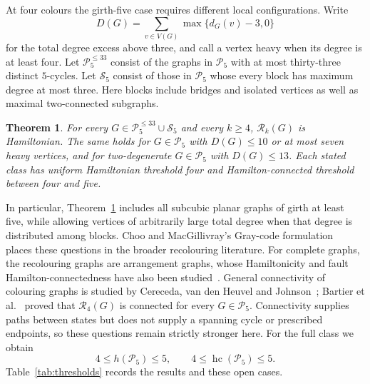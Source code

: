 \documentclass[11pt]{article}
\newtheorem{theorem}{Theorem}[section]
\theoremstyle{remark}
\newcommand{\R}{\mathcal R}
\newcommand{\Rk}{\mathcal R_k}
\newcommand{\hc}{\operatorname{hc}}
\numberwithin{equation}{section}
\numberwithin{table}{section}
\begin{document}
At four colours the girth-five case requires different local
configurations. Write
\[
 D(G)=\sum_{v\in V(G)}\max\{d_G(v)-3,0\}
\]
for the total degree excess above three, and call a vertex heavy when
its degree is at least four. Let $\mathcal P_5^{\le33}$ consist of
the graphs in $\mathcal P_5$ with at most thirty-three distinct
$5$-cycles. Let
$\mathcal S_5$ consist of those in $\mathcal P_5$ whose every block
has maximum degree at most three. Here blocks include bridges and
isolated vertices as well as maximal two-connected subgraphs.

\begin{theorem}\label{thm:main-four}
For every $G\in\mathcal P_5^{\le33}\cup\mathcal S_5$ and every $k\ge4$,
$\Rk(G)$ is Hamiltonian. The same holds for $G\in\mathcal P_5$ with
$D(G)\le10$ or at most seven heavy vertices, and for two-degenerate
$G\in\mathcal P_5$ with $D(G)\le13$. Each stated class has uniform
Hamiltonian threshold four and Hamilton-connected threshold between
four and five.
\end{theorem}

In particular, Theorem~\ref{thm:main-four} includes all subcubic planar
graphs of girth at least five, while allowing vertices of arbitrarily
large total degree when that degree is distributed among blocks.
Choo and MacGillivray's Gray-code formulation~\cite{ChMa11} places these
questions in the broader recolouring literature.  For complete graphs,
the recolouring graphs are arrangement graphs, whose Hamiltonicity and
fault Hamilton-connectedness have also been studied~\cite{HLTH04}.
General connectivity of colouring graphs is studied by Cereceda,
van den Heuvel and Johnson~\cite{CVJ08}; Bartier et al.~\cite{BBFHMP23}
proved that $\R_4(G)$ is connected for every $G\in\mathcal P_5$.
Connectivity supplies paths between states but
does not supply a spanning cycle or prescribed endpoints, so these questions
remain strictly stronger here.  For the full class we obtain
\[
4\le h(\mathcal P_5)\le5,\qquad 4\le\hc(\mathcal P_5)\le5.
\]
Table~\ref{tab:thresholds} records the results and these open cases.
\end{document}
